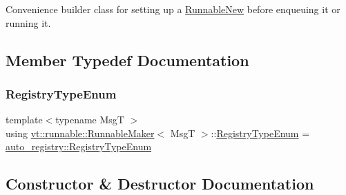 Convenience builder class for setting up a {\ttfamily \hyperlink{structvt_1_1runnable_1_1_runnable_new}{Runnable\+New}} before enqueuing it or running it. 

\subsection{Member Typedef Documentation}
\mbox{\label{structvt_1_1runnable_1_1_runnable_maker_a686c9c671055431e7d1624bc60025cc5}} 
\subsubsection{\texorpdfstring{Registry\+Type\+Enum}{RegistryTypeEnum}}
{\footnotesize\ttfamily template$<$typename MsgT $>$ \\
using \hyperlink{structvt_1_1runnable_1_1_runnable_maker}{vt\+::runnable\+::\+Runnable\+Maker}$<$ MsgT $>$\+::\hyperlink{namespacevt_1_1auto__registry_a9f369ca2b484130b396729e2ddf05241}{Registry\+Type\+Enum} =  \hyperlink{namespacevt_1_1auto__registry_a9f369ca2b484130b396729e2ddf05241}{auto\+\_\+registry\+::\+Registry\+Type\+Enum}}



\subsection{Constructor \& Destructor Documentation}
\mbox{\label{structvt_1_1runnable_1_1_runnable_maker_a6c8b584a14ce68c2d5d516c68ba5d64b}} 
